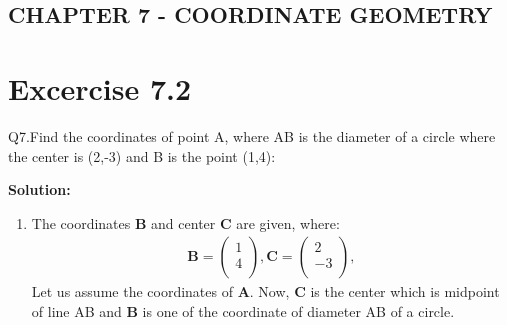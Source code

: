 \documentclass[12pt]{article}
\newcommand{\solution}{\noindent \textbf{Solution: }}
\newcommand{\myvec}[1]{\ensuremath{\begin{pmatrix}#1\end{pmatrix}}}
\let\vec\mathbf
\begin{document}
\begin{center}
\section*{CHAPTER 7 - COORDINATE GEOMETRY}

\end{center}
\section*{Excercise 7.2}

Q7.Find the coordinates of point A, where AB is the diameter of a circle where the center is (2,-3) and B is the point (1,4):

\solution
\begin{enumerate}
\item The coordinates $\vec{B}$ and center $\vec{C}$ are given, where:
	\begin{align}
	\vec{B} = \myvec{
		1\\
	    4\\
		},
	\vec{C} = \myvec{
	    2\\
	   -3\\
		},
	\end{align}
Let us assume the coordinates of $\vec{A}$. Now, $\vec{C}$ is the center which is midpoint of line AB and $\vec{B}$ is one of the coordinate of diameter AB of a circle.
		

\end{enumerate}
\end{document}
